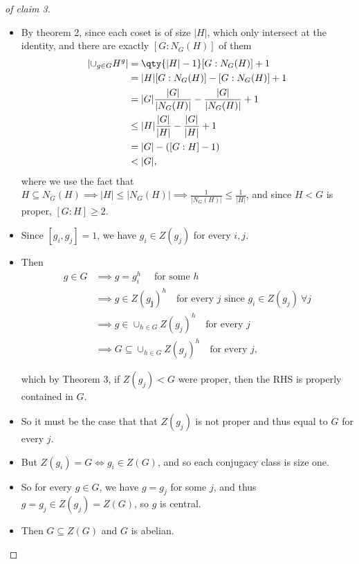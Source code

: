 \begin{solution}
\begin{proof}[of claim 3]
\begin{itemize}
\item
  By theorem 2, since each coset is of size
  \({\left\lvert {H} \right\rvert}\), which only intersect at the
  identity, and there are exactly \([G: N_G(H)]\) of them
  \begin{align*}
  {\left\lvert {\cup_{g\in G} H^g} \right\rvert} 
  &= \qty{ {\left\lvert {H} \right\rvert} - 1} [G: N_G(H)] + 1\\
  &= {\left\lvert {H} \right\rvert} [G: N_G(H)]  - [G:N_G(H)] + 1\\
  &= {\left\lvert {G} \right\rvert} \frac{{\left\lvert {G} \right\rvert}}{{\left\lvert {N_G(H)} \right\rvert}} - \frac{{\left\lvert {G} \right\rvert}}{{\left\lvert {N_G(H)} \right\rvert}} + 1 \\
  &\leq {\left\lvert {H} \right\rvert} \frac{{\left\lvert {G} \right\rvert}}{{\left\lvert {H} \right\rvert}} - \frac{{\left\lvert {G} \right\rvert}}{{\left\lvert {H} \right\rvert}} + 1 \\
  &= {\left\lvert {G} \right\rvert} - ([G: H] - 1) \\
  &< {\left\lvert {G} \right\rvert} 
  ,\end{align*}
  where we use the fact that
  \(H \subseteq N_G(H) \implies {\left\lvert {H} \right\rvert} \leq {\left\lvert {N_G(H)} \right\rvert} \implies \frac{1}{{\left\lvert {N_G(H)} \right\rvert}} \leq \frac{1}{{\left\lvert {H} \right\rvert}}\),
  and since \(H < G\) is proper, \([G:H] \geq 2\).
\item
  Since \([g_i, g_j] = 1\), we have \(g_i \in Z(g_j)\) for every
  \(i, j\).
\item
  Then
  \begin{align*}
  g\in G 
  &\implies g = g_i^h \quad \text{ for some } h \\
  &\implies g \in Z(g_\mathbf{j})^h \quad\text{for every } j \text{ since }g_i \in Z(g_j) ~\forall j \\
  &\implies g \in \cup_{h\in G} Z(g_j)^h \quad\text{for every } j\\
  &\implies G \subseteq \cup_{h\in G} Z(g_j)^h \quad\text{for every } j
  ,\end{align*}

  which by Theorem 3, if \(Z(g_j) < G\) were proper, then the RHS is
  properly contained in \(G\).
\item
  So it must be the case that that \(Z(g_j)\) is not proper and thus
  equal to \(G\) for every \(j\).
\item
  But \(Z(g_i) = G \iff g_i \in Z(G)\), and so each conjugacy class is
  size one.
\item
  So for every \(g\in G\), we have \(g = g_j\) for some \(j\), and thus
  \(g = g_j \in Z(g_j) = Z(G)\), so \(g\) is central.
\item
  Then \(G\subseteq Z(G)\) and \(G\) is abelian.
\end{itemize}

\end{proof}

\end{solution}

